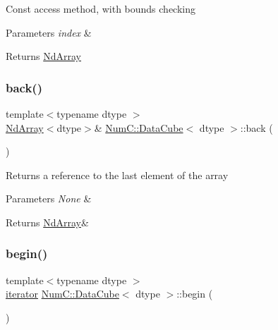 Const access method, with bounds checking


\begin{DoxyParams}{Parameters}
{\em index} & \\
\hline
\end{DoxyParams}
\begin{DoxyReturn}{Returns}
\mbox{\hyperlink{class_num_c_1_1_nd_array}{Nd\+Array}} 
\end{DoxyReturn}
\mbox{\label{class_num_c_1_1_data_cube_a5ca3940c4aad34665e9d6104a05a6899}} 
\subsubsection{\texorpdfstring{back()}{back()}}
{\footnotesize\ttfamily template$<$typename dtype $>$ \\
\mbox{\hyperlink{class_num_c_1_1_nd_array}{Nd\+Array}}$<$dtype$>$\& \mbox{\hyperlink{class_num_c_1_1_data_cube}{Num\+C\+::\+Data\+Cube}}$<$ dtype $>$\+::back (\begin{DoxyParamCaption}{ }\end{DoxyParamCaption})\hspace{0.3cm}{\ttfamily [inline]}}

Returns a reference to the last element of the array


\begin{DoxyParams}{Parameters}
{\em None} & \\
\hline
\end{DoxyParams}
\begin{DoxyReturn}{Returns}
\mbox{\hyperlink{class_num_c_1_1_nd_array}{Nd\+Array}}\& 
\end{DoxyReturn}
\mbox{\label{class_num_c_1_1_data_cube_ab3d0a674028d5aab89d56a2d591ff17e}} 
\subsubsection{\texorpdfstring{begin()}{begin()}}
{\footnotesize\ttfamily template$<$typename dtype $>$ \\
\mbox{\hyperlink{class_num_c_1_1_data_cube_aa3703e7574db61a4e1ef4b8db93db86a}{iterator}} \mbox{\hyperlink{class_num_c_1_1_data_cube}{Num\+C\+::\+Data\+Cube}}$<$ dtype $>$\+::begin (\begin{DoxyParamCaption}{ }\end{DoxyParamCaption})\hspace{0.3cm}{\ttfamily [inline]}}


